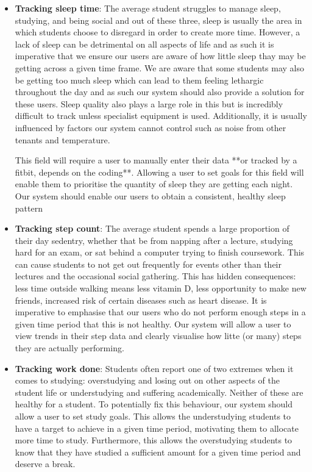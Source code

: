 \documentclass[12pt]{article}
\begin{document}
\begin{itemize}

    \item \textbf{Tracking sleep time}: The average student struggles to manage sleep, studying, and being social and out of these three, sleep is usually the area in which students choose to disregard in order to create more time. However, a lack of sleep can be detrimental on all aspects of life and as such it is imperative that we ensure our users are aware of how little sleep thay may be getting across a given time frame. We are aware that some students may also be getting too much sleep which can lead to them feeling lethargic throughout the day and as such our system should also provide a solution for these users. Sleep quality also plays a large role in this but is incredibly difficult to track unless specialist equipment is used. Additionally, it is usually influenced by factors our system cannot control such as noise from other tenants and temperature.

This field will require a user to manually enter their data **or tracked by a fitbit, depends on the coding**. Allowing a user to set goals for this field will enable them to prioritise the quantity of sleep they are getting each night. Our system should enable our users to obtain a consistent, healthy sleep pattern
    
    \item \textbf{Tracking step count}: The average student spends a large proportion of their day sedentry, whether that be from napping after a lecture, studying hard for an exam, or sat behind a computer trying to finish coursework. This can cause students to not get out frequently for events other than their lectures and the occasional social gathering. This has hidden consequences: less time outside walking means less vitamin D, less opportunity to make new friends, increased risk of certain diseases such as heart disease. It is imperative to emphasise that our users who do not perform enough steps in a given time period that this is not healthy. Our system will allow a user to view trends in their step data and clearly visualise how litte (or many) steps they are actually performing.

    \item \textbf{Tracking work done}: Students often report one of two extremes when it comes to studying: overstudying and losing out on other aspects of the student life or understudying and suffering academically. Neither of these are healthy for a student. To potentially fix this behaviour, our system should allow a user to set study goals. This allows the understudying students to have a target to achieve in a given time period, motivating them to allocate more time to study. Furthermore, this allows the overstudying students to know that they have studied a sufficient amount for a given time period and deserve a break.
    

\end{itemize}
\end{document}
